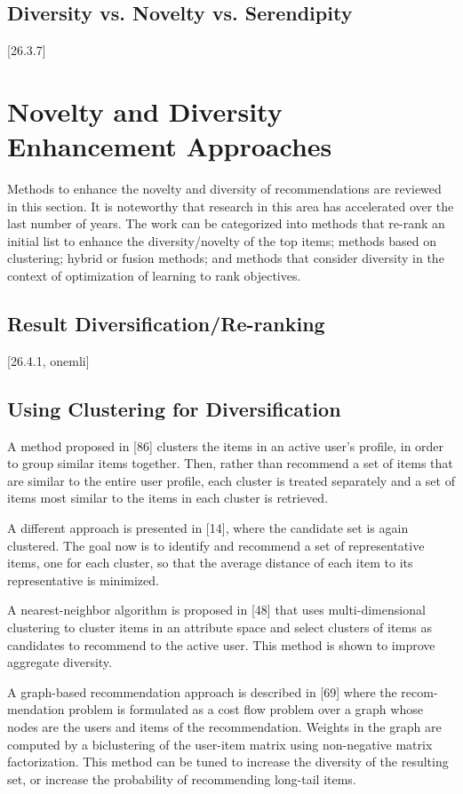 \subsection{Diversity vs. Novelty vs. Serendipity}
[26.3.7]

\section{Novelty and Diversity Enhancement Approaches}

Methods to enhance the novelty and diversity of recommendations are reviewed in this section. It is noteworthy that research in this area has accelerated over the last number of years. The work can be categorized into methods that re-rank an initial list to enhance the diversity/novelty of the top items; methods based on clustering; hybrid or fusion methods; and methods that consider diversity in the context of optimization of learning to rank objectives.

\subsection{Result Diversification/Re-ranking}
[26.4.1, onemli]

\subsection{Using Clustering for Diversification}

A method proposed in [86] clusters the items in an active user’s profile, in order to group similar items together. Then, rather than recommend a set of items that are similar to the entire user profile, each cluster is treated separately and a set of items most similar to the items in each cluster is retrieved.

A different approach is presented in [14], where the candidate set is again clustered. The goal now is to identify and recommend a set of representative items, one for each cluster, so that the average distance of each item to its representative is minimized.

A nearest-neighbor algorithm is proposed in [48] that uses multi-dimensional clustering to cluster items in an attribute space and select clusters of items as candidates to recommend to the active user. This method is shown to improve aggregate diversity.

A graph-based recommendation approach is described in [69] where the recom- mendation problem is formulated as a cost flow problem over a graph whose nodes are the users and items of the recommendation. Weights in the graph are computed by a biclustering of the user-item matrix using non-negative matrix factorization. This method can be tuned to increase the diversity of the resulting set, or increase the probability of recommending long-tail items.

